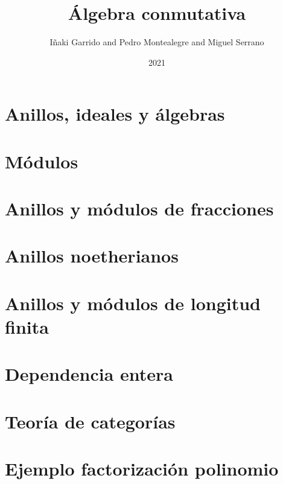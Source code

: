 \documentclass[a4paper,12pt]{book}
\title{Álgebra conmutativa}
\author{Iñaki Garrido and Pedro Montealegre and Miguel Serrano}
\date{2021}
\theoremstyle{definition}
\begin{document}
\maketitle
\tableofcontents
\chapter{Anillos, ideales y álgebras}

\chapter{Módulos}

\chapter{Anillos y módulos de fracciones}

\chapter{Anillos noetherianos}

\chapter{Anillos y módulos de longitud finita}

\chapter{Dependencia entera}



\appendix
\chapter{Teoría de categorías}

\chapter{Ejemplo factorización polinomio}

\end{document}
